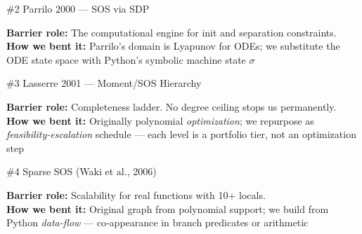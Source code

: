\documentclass[aspectratio=169]{beamer}
\begin{document}
\begin{frame}{\#2 Parrilo 2000 --- SOS via SDP}

\vspace{0.8em}
\textbf{Barrier role:} The computational engine for init and separation constraints.\\[3pt]
\textbf{How we bent it:} Parrilo's domain is Lyapunov for ODEs; we substitute the ODE state space with Python's symbolic machine state $\sigma$
\end{frame}

\begin{frame}{\#3 Lasserre 2001 --- Moment/SOS Hierarchy}

\vspace{0.8em}
\textbf{Barrier role:} Completeness ladder. No degree ceiling stops us permanently.\\[3pt]
\textbf{How we bent it:} Originally polynomial \emph{optimization}; we repurpose as \emph{feasibility-escalation} schedule --- each level is a portfolio tier, not an optimization step
\end{frame}

\begin{frame}{\#4 Sparse SOS (Waki et al., 2006)}

\vspace{0.8em}
\textbf{Barrier role:} Scalability for real functions with 10+ locals.\\[3pt]
\textbf{How we bent it:} Original graph from polynomial support; we build from Python \emph{data-flow} --- co-appearance in branch predicates or arithmetic
\end{frame}
\end{document}
